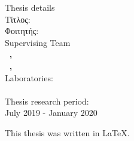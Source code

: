\pagestyle{empty}
\hspace{10pt}
\begin{center}
\Large{Thesis details}\\[1cm]
{\large Τίτλος:}
\textbf{\large \doctitle}\\[1cm]
\large {Φοιτητής: \textbf{\nomme}\\[1cm]
\large{Supervising Team}\\
\textbf{\suptitle \, \supname , \supuni}\\[1cm]
\textbf{\cosuptitle \, \cosupname , \cosupuni} \\[1cm]
Laboratories:\\
\lab \\[1cm]
Thesis research period:\\ July 2019 - January 2020\\[1cm]}
\end{center}

\vspace{5em}

\begin{center}
  { \large
    This thesis was written in \LaTeX.\\
  }
\end{center}

